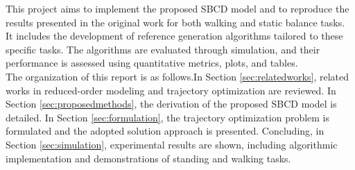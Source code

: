 \documentclass[main.tex]{subfiles}
\begin{document}
This project aims to implement the proposed SBCD model and to reproduce the results presented in the original work for both walking and static balance tasks. It includes the development of reference generation algorithms tailored to these specific tasks. The algorithms are evaluated through simulation, and their performance is assessed using quantitative metrics, plots, and tables.\\
\newline
The organization of this report is as follows.In Section \ref{sec:relatedworks}, related works in reduced-order modeling and trajectory optimization are reviewed. In Section \ref{sec:proposedmethods}, the derivation of the proposed SBCD model is detailed. In Section \ref{sec:formulation}, the trajectory optimization problem is formulated and the adopted solution approach is presented. Concluding, in Section \ref{sec:simulation}, experimental results are shown, including algorithmic implementation and demonstrations of standing and walking tasks. 
\end{document}
